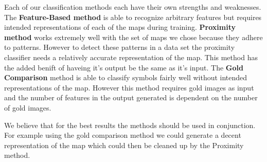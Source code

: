 
Each of our classification methods each have their own strengths and
weaknesses.  The \textbf{Feature-Based method} is able to recognize arbitrary
features but requires intended representations of each of the maps during
training. \textbf{Proximity method} works extremely well with the set of maps
we chose because they adhere to patterns. However to detect these patterns in a
data set the proximity classifier needs a relatively accurate representation of
the map. This method has the added benift of haveing it's output be the same as
it's input.  The \textbf{Gold Comparison} method is able to classify symbols
fairly well without intended representations of the map. However this method
requires gold images as input and the number of features in the output
generated is dependent on the number of gold images.

We believe that for the best results the methods should be used in conjunction.
For example using the gold comparison method we could generate a decent
representation of the map which could then be cleaned up by the Proximity
method.
